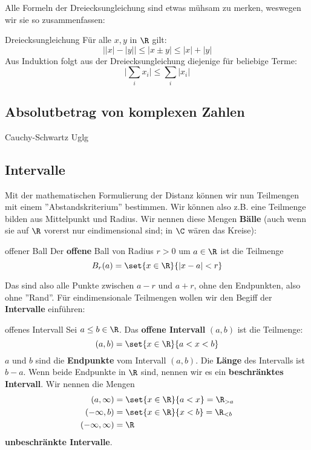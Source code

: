 Alle Formeln der Dreiecksungleichung sind etwas mühsam zu merken, weswegen wir sie so zusammenfassen:
\begin{lemma}{Dreiecksungleichung}{} Für alle $x,y$ in $\R$ gilt:
$$\Big| |x|-|y|\Big| \le |x \pm y| \le |x|+|y|$$
Aus Induktion folgt aus der Dreiecksungleichung diejenige für beliebige Terme:
$$\Big| \sum_i{x_i} \Big| \leq \sum_i{|x_i|}$$
\end{lemma}

\subsection{Absolutbetrag von komplexen Zahlen}
\todo{}
Cauchy-Schwartz Uglg

\subsection{Intervalle}
Mit der mathematischen Formulierung der Distanz können wir nun Teilmengen mit einem ''Abstandskriterium'' bestimmen. Wir können also z.B. eine Teilmenge bilden aus Mittelpunkt und Radius. Wir nennen diese Mengen \textbf{Bälle} (auch wenn sie auf $\R$ vorerst nur eindimensional sind; in $\C$ wären das Kreise):

\begin{definition}{offener Ball}{}
Der \textbf{offene} Ball von Radius $r > 0$ um $a \in \R$ ist die Teilmenge
$$B_r(a) = \set{x \in \R }{|x-a| < r}$$
\end{definition}

Das sind also alle Punkte zwischen $a-r$ und $a+r$, ohne den Endpunkten, also ohne ''Rand''. Für eindimensionale Teilmengen wollen wir den Begiff der \textbf{Intervalle} einführen:

\begin{definition}{offenes Intervall}{} Sei $a \leq b \in \R$. Das \textbf{offene Intervall} $(a,b)$ ist die Teilmenge:
$$(a, b) = \set{x \in \R}{a < x < b}$$
$a$ und $b$ sind die \textbf{Endpunkte} vom Intervall $(a,b)$. Die \textbf{Länge} des Intervalls ist $b-a$. Wenn beide Endpunkte in $\R$ sind, nennen wir es ein \textbf{beschränktes Intervall}. Wir nennen die Mengen 
\begin{align*}
    (a, \infty) &= \set{x \in \R}{a < x} = \R_{>a}\\
    (-\infty, b) &= \set{x \in \R}{x < b} = \R_{<b}\\
    (-\infty, \infty) &= \R
\end{align*}
\textbf{unbeschränkte Intervalle}.
\end{definition}

